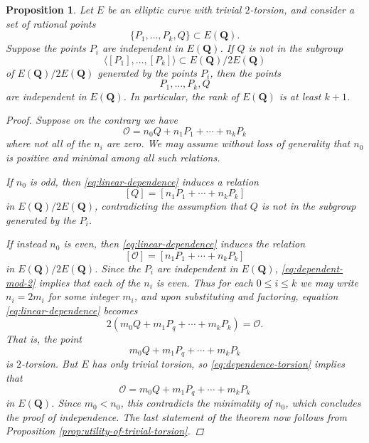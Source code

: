 \documentclass{amsart}
\newtheorem{proposition}[theorem]{Proposition}
\numberwithin{equation}{section}
\theoremstyle{remark}
\newcommand{\Q}{\mathbf{Q}}
\begin{document}
\begin{proposition}\label{prop:non-doubles-contribute-to-rank}
Let $E$ be an elliptic curve with trivial $2$-torsion, and consider a set of rational points $$\{P_1,\ldots,P_k, Q\} \subset E(\Q).$$ Suppose the points $P_i$ are independent in $E(\Q)$. If $Q$ is not in the subgroup $$\langle [P_1], \ldots, [P_{k}] \rangle \subset E(\Q)/2E(\Q)$$ of $E(\Q)/2E(\Q)$ generated by the points $P_i$, then the points $$P_1,\ldots,P_k,Q$$ are independent in $E(\Q)$. In particular, the rank of $E(\Q)$ is at least $k+1$.
\begin{proof}
Suppose on the contrary we have
\begin{equation}\label{eq:linear-dependence}
\mathcal{O} =n_0 Q +n_1 P_1 + \cdots + n_{k}P_{k}
\end{equation}
where not all of the $n_i$ are zero. We may assume without loss of generality that $n_0$ is positive and minimal among all such relations.

If $n_0$ is odd, then \eqref{eq:linear-dependence} induces a relation
\[
[Q] = [n_1 P_1 + \cdots +n_{k}P_{k}]
\]
in $E(\Q)/2E(\Q)$, contradicting the assumption that $Q$ is not in the subgroup generated by the $P_i$.

If instead $n_0$ is even, then \eqref{eq:linear-dependence} induces the relation
\begin{equation}\label{eq:dependent-mod-2}
[\mathcal{O}] = [n_1 P_1 + \cdots+ n_{k}P_{k}]
\end{equation}
in $E(\Q)/2E(\Q)$. Since the $P_i$ are independent in $E(\Q)$, \eqref{eq:dependent-mod-2} implies that each of the $n_i$ is even. Thus for each $0 \leq i \leq k$ we may write $n_i=2m_i$ for some integer $m_i$, and upon substituting and factoring, equation \eqref{eq:linear-dependence} becomes
\begin{equation}\label{eq:dependence-torsion}
2(m_0 Q + m_1 P_q + \cdots +m_k P_k) = \mathcal{O}.
\end{equation}
That is, the point
\[
m_0 Q + m_1 P_q + \cdots +m_k P_k
\]
is $2$-torsion. But $E$ has only trivial torsion, so \eqref{eq:dependence-torsion} implies that
\[
\mathcal{O}=m_0 Q + m_1 P_q + \cdots +m_k P_k
\]
in $E(\Q)$. Since $m_0 < n_0$, this contradicts the minimality of $n_0$, which concludes the proof of independence. The last statement of the theorem now follows from Proposition \ref{prop:utility-of-trivial-torsion}.
\end{proof}

\end{proposition}
\end{document}
